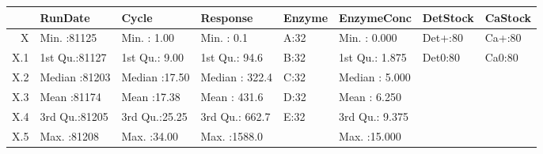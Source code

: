 \begin{table}[ht]
\centering
\begin{tabular}{rlllllll}
  \hline
 &    RunDate &     Cycle &    Response & Enzyme &   EnzymeConc & DetStock & CaStock \\ 
  \hline
X & Min.   :81125   & Min.   : 1.00   & Min.   :   0.1   & A:32   & Min.   : 0.000   & Det+:80   & Ca+:80   \\ 
  X.1 & 1st Qu.:81127   & 1st Qu.: 9.00   & 1st Qu.:  94.6   & B:32   & 1st Qu.: 1.875   & Det0:80   & Ca0:80   \\ 
  X.2 & Median :81203   & Median :17.50   & Median : 322.4   & C:32   & Median : 5.000   &  &  \\ 
  X.3 & Mean   :81174   & Mean   :17.38   & Mean   : 431.6   & D:32   & Mean   : 6.250   &  &  \\ 
  X.4 & 3rd Qu.:81205   & 3rd Qu.:25.25   & 3rd Qu.: 662.7   & E:32   & 3rd Qu.: 9.375   &  &  \\ 
  X.5 & Max.   :81208   & Max.   :34.00   & Max.   :1588.0   &  & Max.   :15.000   &  &  \\ 
   \hline
\end{tabular}
\end{table}
